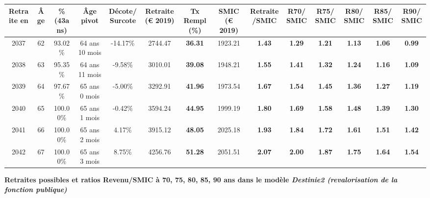 \begin{adjustbox}{max width=\textwidth} 
\begin{tabular}[htb]{|c|c||c|c|c||c|c||c|c||c|c|c|c|c|} 
\hline 
 Retraite en &  Âge &  \%(43ans) &  Âge pivot &  Décote/Surcote &  Retraite (\euro{} 2019) &  Tx Rempl(\%) &  SMIC (\euro{} 2019) &  Retraite/SMIC &  R70/SMIC &  R75/SMIC &  R80/SMIC &  R85/SMIC &  R90/SMIC \\ 
\hline \hline 
 2037 &  62 &  93.02\% &  64 ans 10 mois &  -14.17\% &  2744.47 &  {\bf 36.31} &  1923.21 &  {\bf 1.43} &  {\bf 1.29} &  {\bf 1.21} &  {\bf 1.13} &  {\bf 1.06} &  {\bf {\color{red} 0.99}} \\ 
\hline 
 2038 &  63 &  95.35\% &  64 ans 11 mois &  -9.58\% &  3010.01 &  {\bf 39.08} &  1948.21 &  {\bf 1.55} &  {\bf 1.41} &  {\bf 1.32} &  {\bf 1.24} &  {\bf 1.16} &  {\bf 1.09} \\ 
\hline 
 2039 &  64 &  97.67\% &  65 ans 0 mois &  -5.00\% &  3292.91 &  {\bf 41.96} &  1973.54 &  {\bf 1.67} &  {\bf 1.54} &  {\bf 1.45} &  {\bf 1.36} &  {\bf 1.27} &  {\bf 1.19} \\ 
\hline 
 2040 &  65 &  100.00\% &  65 ans 1 mois &  -0.42\% &  3594.24 &  {\bf 44.95} &  1999.19 &  {\bf 1.80} &  {\bf 1.69} &  {\bf 1.58} &  {\bf 1.48} &  {\bf 1.39} &  {\bf 1.30} \\ 
\hline 
 2041 &  66 &  100.00\% &  65 ans 2 mois &  4.17\% &  3915.12 &  {\bf 48.05} &  2025.18 &  {\bf 1.93} &  {\bf 1.84} &  {\bf 1.72} &  {\bf 1.61} &  {\bf 1.51} &  {\bf 1.42} \\ 
\hline 
 2042 &  67 &  100.00\% &  65 ans 3 mois &  8.75\% &  4256.76 &  {\bf 51.28} &  2051.51 &  {\bf 2.07} &  {\bf 2.00} &  {\bf 1.87} &  {\bf 1.75} &  {\bf 1.64} &  {\bf 1.54} \\ 
\hline 
\hline 
\end{tabular} 
\end{adjustbox} 
 
 \vspace{0.1cm} 
{\bf \noindent Retraites possibles et ratios Revenu/SMIC à 70, 75, 80, 85, 90 ans dans le modèle \emph{Destinie2 (revalorisation de la fonction publique)}}  
 
